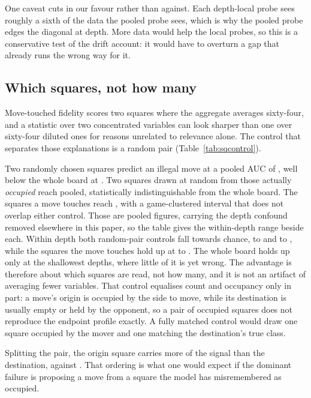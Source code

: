 \documentclass[11pt]{article}
\theoremstyle{remark}
\begin{document}
One caveat cuts in our favour rather than against. Each depth-local probe sees
roughly a sixth of the data the pooled probe sees, which is why the pooled probe
edges the diagonal at depth. More data would help the local probes, so this is a
conservative test of the drift account: it would have to overturn a gap that
already runs the wrong way for it.

\subsection{Which squares, not how many}
\label{sec:sqcontrol}

Move-touched fidelity scores two squares where the aggregate averages
sixty-four, and a statistic over two concentrated variables can look sharper than
one over sixty-four diluted ones for reasons unrelated to relevance alone. The control
that separates those explanations is a random pair (Table~\ref{tab:sqcontrol}).



Two randomly chosen squares predict an illegal move at a pooled AUC of
, well below the whole board at . Two
squares drawn at random from those actually \emph{occupied} reach
 pooled, statistically indistinguishable from the whole
board. The squares a move touches reach , with a
game-clustered interval that does not overlap either control. Those are pooled figures, carrying the depth
confound removed elsewhere in this paper, so the table gives the within-depth
range beside each. Within depth both random-pair controls fall towards chance,
 to  and
 to , while the squares the
move touches hold up at  to
. The whole board holds up only at the shallowest
depths, where little of it is yet wrong. The advantage is therefore about
which squares are read, not how many, and it is not an artifact of averaging
fewer variables. That control equalises count and occupancy only in part: a
move's origin is occupied by the side to move, while its destination is usually
empty or held by the opponent, so a pair of occupied squares does not reproduce
the endpoint profile exactly. A fully matched control would draw one square
occupied by the mover and one matching the destination's true class.

Splitting the pair, the origin square carries more of the signal than the
destination,  against . That ordering is
what one would expect if the dominant failure is proposing a move from a square
the model has misremembered as occupied.
\end{document}
